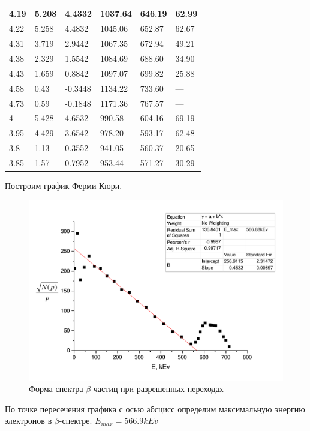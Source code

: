 \documentclass[a4paper,12pt]{article}
\begin{document}
\begin{table}[h!]
\begin{tabular}{|l|l|l|l|l|l|}
4.19 & 5.208 & 4.4332  & 1037.64 & 646.19 & 62.99   \\ \hline
4.22 & 5.258 & 4.4832  & 1045.06 & 652.87 & 62.67   \\ \hline
4.31 & 3.719 & 2.9442  & 1067.35 & 672.94 & 49.21   \\ \hline
4.38 & 2.329 & 1.5542  & 1084.69 & 688.60 & 34.90   \\ \hline
4.43 & 1.659 & 0.8842  & 1097.07 & 699.82 & 25.88   \\ \hline
4.58 & 0.43  & -0.3448 & 1134.22 & 733.60 & ---     \\ \hline
4.73 & 0.59  & -0.1848 & 1171.36 & 767.57 & ---     \\ \hline
4    & 5.428 & 4.6532  & 990.58  & 604.16 & 69.19   \\ \hline
3.95 & 4.429 & 3.6542  & 978.20  & 593.17 & 62.48   \\ \hline
3.8  & 1.13  & 0.3552  & 941.05  & 560.37 & 20.65   \\ \hline
3.85 & 1.57  & 0.7952  & 953.44  & 571.27 & 30.29   \\ \hline
\end{tabular}
\end{table}

\newpage

Построим график Ферми-Кюри.

\begin{figure}[h!]
			\centering
			\includegraphics[width=\linewidth]{fermi.pdf}
			\caption{Форма спектра $\beta$-частиц при разрешенных переходах}
		\end{figure}
		
		
По точке пересечения графика с осью абсцисс определим максимальную энергию электронов в $\beta$-спектре. 
$E_{max} = 566.9 kEv$
\end{document}
